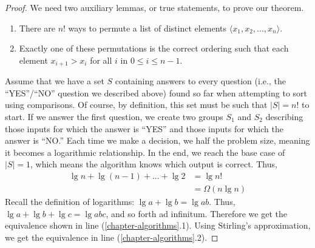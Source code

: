 \begin{proof}
We need two auxiliary lemmas, or true statements, to prove our theorem.
\begin{enumerate}[label=(\alph*)]
  \item There are $n!$ ways to permute a list of distinct elements $\langle{x_1, x_2, ..., x_n}\rangle$. \item Exactly one of these permutations is the correct ordering such that each element $x_{i+1} > x_{i}$ for all $i$ in $0 \leq i \leq n-1$. 
\end{enumerate}

Assume that we have a set $S$ containing answers to every question (i.e., the ``YES''/``NO'' question we described above) found so far when attempting to sort using comparisons. Of course, by definition, this set must be such that $|S|=n!$ to start. If we answer the first question, we create two groups $S_1$ and $S_2$ describing those inputs for which the answer is ``YES'' and those inputs for which the answer is ``NO.'' Each time we make a decision, we half the problem size, meaning it becomes a logarithmic relationship. In the end, we reach the base case of $|S|=1$, which means the algorithm knows which output is correct. Thus,
\begin{align}
\lg{n} + \lg{(n-1)} + ... + \lg{2} &= \lg{n!}\\
        &= \Omega(n \lg n)
\end{align}
Recall the definition of logarithms: $\lg{a} + \lg{b} = \lg{ab}$. Thus, $\lg{a} + \lg{b} + \lg{c} = \lg{abc}$, and so forth ad infinitum. Therefore we get the equivalence shown in line (\ref{chapter-algorithms}.1). Using Stirling's approximation, we get the equivalence in line (\ref{chapter-algorithms}.2).
\end{proof}
